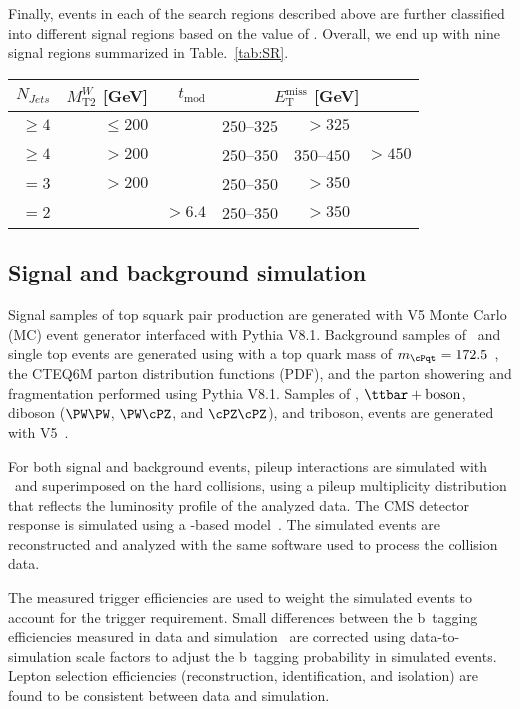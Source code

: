Finally, events in each of the search regions described above are further classified into different signal regions 
based on the value of \MET. Overall, we end up with nine signal regions summarized in Table.~\ref{tab:SR}.
\begin{table}
\begin{center}
\begin{tabular}{|r|r|r|rrr|}
\hline
$N_{Jets}$ & $M_\mathrm{T2}^W$ [GeV] & $t_\mathrm{mod}$ & \multicolumn{3}{c|}{$E_\mathrm{T}^\mathrm{miss}$ [GeV]} \\
\hline
$\geq4$ & $\leq 200$ & & $250$--$325$ & $>325$ & \\
$\geq4$ & $> 200$ & & $250$--$350$ & $350$--$450$ & $>450$ \\
\hline
$=3$ & $>200$ & & $250$--$350$ & $>350$ & \\
\hline
$=2$ & & $>6.4$ & $250$--$350$ & $>350$ & \\
\hline
\end{tabular}
\end{center}
\end{table}


\subsection{Signal and background simulation}
\label{sec:mc}

Signal samples of top squark pair production are generated with \MADGRAPH V5 Monte Carlo (MC) event 
generator interfaced with Pythia V8.1. Background samples of \ttbar\ and single top events are generated using \POWHEG 
with a top quark mass of $m_\cPqt=172.5$~\GeV, the CTEQ6M parton distribution functions (PDF), 
and the parton showering and fragmentation performed using Pythia V8.1.
Samples of \wjets, $\ttbar+\text{boson}$, diboson ($\PW\PW$, $\PW\cPZ$, and $\cPZ\cPZ$), and triboson,
events are generated with \MADGRAPH V5~\cite{Alwall:2011uj}.

For both signal and background events, pileup interactions are simulated with \PYTHIA\ and superimposed on the hard collisions,
using a pileup multiplicity distribution that reflects the luminosity profile of the analyzed data.
The CMS detector response is simulated using a \GEANTfour-based model~\cite{Geant}.
The simulated events are reconstructed and analyzed with the same software used to process the collision data.

The measured trigger efficiencies are used to weight the simulated events to account for the trigger requirement.
Small differences between the b~tagging efficiencies measured in data and simulation~\cite{ref:btag} are 
corrected using data-to-simulation scale factors to adjust the b~tagging probability in simulated events.
Lepton selection efficiencies (reconstruction, identification, and isolation) are found to be consistent between data and 
simulation.

